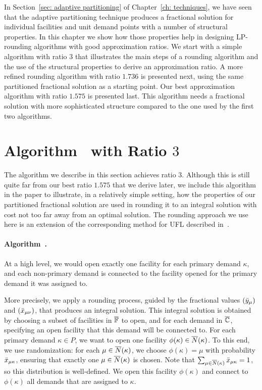 \documentclass[oneside,final]{ucr}
\begin{document}
In Section~\ref{sec: adaptive partitioning} of
Chapter~\ref{ch: techniques}, we have seen that the adaptive
partitioning technique produces a fractional solution for
individual facilities and unit demand points with a number
of structural properties. In this chapter we show how those
properties help in designing LP-rounding algorithms with
good approximation ratios. We start with a simple algorithm
with ratio $3$ that illustrates the main steps of a rounding
algorithm and the use of the structural properties to derive
an approximation ratio. A more refined rounding algorithm
with ratio $1.736$ is presented next, using the same
partitioned fractional solution as a starting point. Our
best approximation algorithm with ratio $1.575$ is presented
last. This algorithm needs a fractional solution with more
sophisticated structure compared to the one used by the
first two algorithms.

\section{Algorithm~{\EGUP} with Ratio $3$}
\label{sec: 3-approximation}

The algorithm we describe in this section achieves ratio
$3$. Although this is still quite far from our best ratio
$1.575$ that we derive later, we include this algorithm in
the paper to illustrate, in a relatively simple setting, how
the properties of our partitioned fractional solution are
used in rounding it to an integral solution with cost not
too far away from an optimal solution.  The rounding
approach we use here is an extension of the corresponding
method for UFL described in~\cite{gupta08}.

\paragraph{Algorithm~{\EGUP.}}
At a high level, we would open exactly one facility for each
primary demand $\kappa$, and each non-primary demand is
connected to the facility opened for the primary demand it
was assigned to.

More precisely, we apply a rounding process, guided by the
fractional values $({\bar y}_{\mu})$ and $({\bar x}_{\mu\nu})$,
that produces an integral solution. This integral solution
is obtained by choosing a subset of facilities in
$\overline{\mathbb{F}}$ to open, and for each demand in $\overline{\mathbb{C}}$,
specifying an open facility that this demand will be
connected to.  For each primary demand $\kappa\in P$, we
want to open one facility $\phi(\kappa) \in
{\overline{N}}(\kappa)$. To this end, we use randomization: for each
$\mu\in{\overline{N}}(\kappa)$, we choose $\phi(\kappa) = \mu$ with
probability ${\bar x}_{\mu\kappa}$, ensuring that exactly one
$\mu \in {\overline{N}}(\kappa)$ is chosen. Note that
$\sum_{\mu\in{\overline{N}}(\kappa)}{\bar x}_{\mu\kappa}=1$, so this
distribution is well-defined.  We open this facility
$\phi(\kappa)$ and connect to $\phi(\kappa)$ all demands
that are assigned to $\kappa$.
\end{document}
